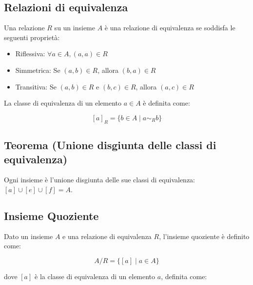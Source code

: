 \documentclass{article}
\begin{document}
\subsection{Relazioni di equivalenza}

Una relazione $R$ su un insieme $A$ è una relazione di equivalenza se soddisfa
le seguenti proprietà:
\begin{itemize}
	\item Riflessiva: $\forall a \in A, (a, a) \in R$
	\item Simmetrica: Se $(a, b) \in R$, allora $(b, a) \in R$
	\item Transitiva: Se $(a, b) \in R$ e $(b, c) \in R$, allora $(a, c) \in R$
\end{itemize}

La classe di equivalenza di un elemento $a \in A$ è definita come:

\[
	[a]_R = \{ b \in A \mid a \sim_R b\}
\]
\newpage
\subsection{Teorema (Unione disgiunta delle classi di equivalenza)}
Ogni insieme è l'unione disgiunta delle sue classi di
equivalenza:$[a]\cup[e]\cup[f]=A$.\\


\subsection{Insieme Quoziente}

Dato un insieme \( A \) e una relazione di equivalenza \( R \), l'insieme
quoziente è definito come:

\[
	A / R = \{ [a] \mid a \in A \}
\]

dove \( [a] \) è la classe di equivalenza di un elemento \( a \), definita
come:
\end{document}

